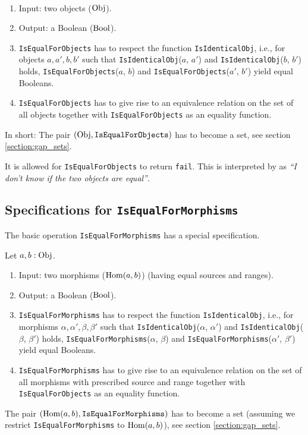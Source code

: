 \begin{specification}
~
 \begin{enumerate}
  \item Input: two objects ($\mathrm{Obj}$).
  \item Output: a Boolean ($\mathrm{Bool}$).
  \item \texttt{IsEqualForObjects} has to respect the \GAP function \texttt{IsIdenticalObj}, i.e., 
  for objects $a, a', b, b'$ such that \texttt{IsIdenticalObj}($a$, $a'$) and \texttt{IsIdenticalObj}($b$, $b'$) holds,
  \texttt{IsEqualForObjects}($a$, $b$) and \texttt{IsEqualForObjects}($a'$, $b'$) yield equal Booleans.
  \item \texttt{IsEqualForObjects} has to give rise to an equivalence relation on the set of all objects together
  with \texttt{IsEqualForObjects} as an equality function.
 \end{enumerate}
 In short: The pair $( \mathrm{Obj}, \texttt{IsEqualForObjects} )$ has to become a \GAP set, see section \ref{section:gap_sets}.
\end{specification}

\begin{remark}
 It is allowed for \texttt{IsEqualForObjects} to return \texttt{fail}. This is interpreted by \CapPkg as
 \textit{``I don't know if the two objects are equal''}.
\end{remark}

\subsection{Specifications for \texttt{IsEqualForMorphisms}}\label{subsection:specifications_is_equal_for_morphisms}
The basic operation \texttt{IsEqualForMorphisms} has a special specification.

\begin{specification}
Let $a, b: \mathrm{Obj}$. 
 \begin{enumerate}
  \item Input: two morphisms ($\operatorname{\mathrm{Hom}}(a,b)$) (having equal sources and ranges).
  \item Output: a Boolean ($\mathrm{Bool}$).
  \item \texttt{IsEqualForMorphisms} has to respect the \GAP function \texttt{IsIdenticalObj}, i.e., 
  for morphisms $\alpha, \alpha', \beta, \beta'$ such that \texttt{IsIdenticalObj}($\alpha$, $\alpha'$) and \texttt{IsIdenticalObj}($\beta$, $\beta'$) holds,
  \texttt{IsEqualForMorphisms}($\alpha$, $\beta$) and \texttt{IsEqualForMorphisms}($\alpha'$, $\beta'$) yield equal Booleans.
  \item \texttt{IsEqualForMorphisms} has to give rise to an equivalence relation on the set of all morphisms with prescribed source and range together
  with \texttt{IsEqualForObjects} as an equality function.
 \end{enumerate}
 The pair $( \operatorname{\mathrm{Hom}}(a,b), \texttt{IsEqualForMorphisms} )$ has to become a \GAP set
 (assuming we restrict \texttt{IsEqualForMorphisms} to $\operatorname{\mathrm{Hom}}(a,b)$), see section \ref{section:gap_sets}.
\end{specification}

